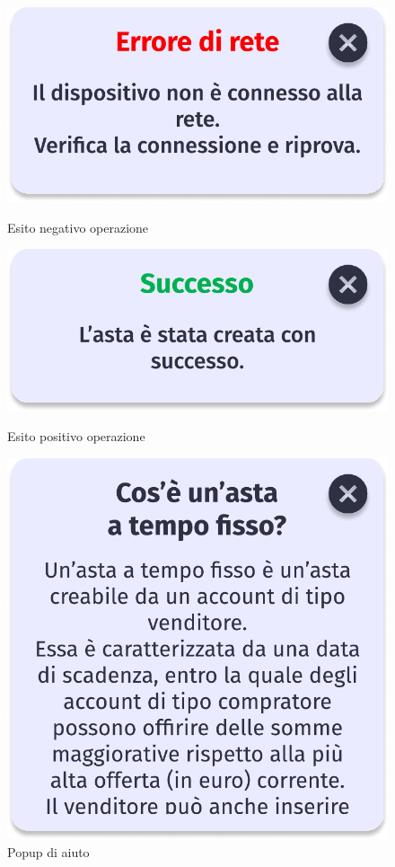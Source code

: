     \begin{figure}[!htb]
        \begin{minipage}{0.32\textwidth}
            \centering
            \includegraphics[width=.7\linewidth]{Immagini/Frames/Popup/P9.pdf}
            \caption{Esito negativo operazione}
        \end{minipage}\hfill
        \begin{minipage}{0.32\textwidth}
            \centering
            \includegraphics[width=.7\linewidth]{Immagini/Frames/Popup/P20.pdf}
            \caption{Esito positivo operazione}
        \end{minipage}\hfill
        \begin{minipage}{0.32\textwidth}
            \centering
            \includegraphics[width=.7\linewidth]{Immagini/Frames/Aiuto/A2.pdf}
            \caption{Popup di aiuto}
        \end{minipage}\hfill
        
    \end{figure}
    
